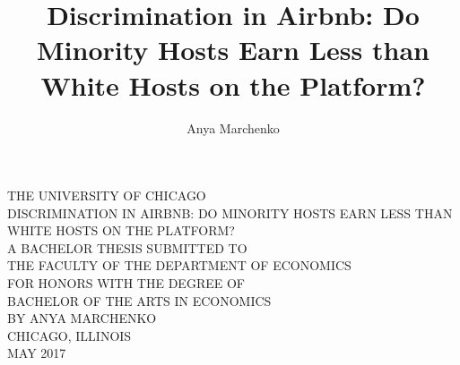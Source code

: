 \documentclass[11pt, oneside]{article}
\begin{document}
\begin{titlepage}
\begin{center}
THE	UNIVERSITY	OF	CHICAGO
\\[1.5in]
DISCRIMINATION IN AIRBNB: DO MINORITY HOSTS EARN LESS THAN WHITE HOSTS ON THE PLATFORM?
\\[1in]
A	BACHELOR	THESIS	SUBMITTED	TO	\\
\bigskip
THE	FACULTY	OF	THE	DEPARTMENT	OF	ECONOMICS	\\
\bigskip
FOR	HONORS	WITH	THE	DEGREE	OF	\\
\bigskip
BACHELOR	OF	THE	ARTS	IN	ECONOMICS
\\[1.5in]
BY ANYA MARCHENKO
\\[1.5in]
CHICAGO,	ILLINOIS	\\
MAY	2017
\end{center}
\end{titlepage}


\title{Discrimination in Airbnb: Do Minority Hosts Earn Less than White Hosts on the Platform?}
\author{Anya Marchenko}
\maketitle
\end{document}

